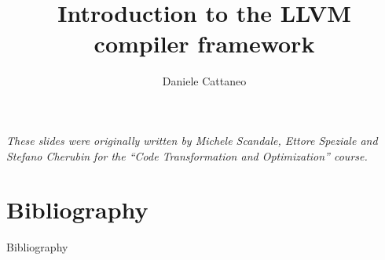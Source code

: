 \documentclass[10pt,mathserif]{beamer}
\author{Daniele Cattaneo}
\institute{Politecnico di Milano}
\date{\DATE}
\title{Introduction to the LLVM compiler framework}
\begin{document}
\begin{frame}
\maketitle
\begin{center}
\itshape\scriptsize
These slides were originally written by
Michele Scandale, Ettore Speziale and Stefano Cherubin for the
``Code Transformation and Optimization'' course.
\end{center}
\end{frame}










\section{Bibliography}
\begin{frame}[allowframebreaks]{Bibliography}
\nocite{*}


\end{frame}
\end{document}
